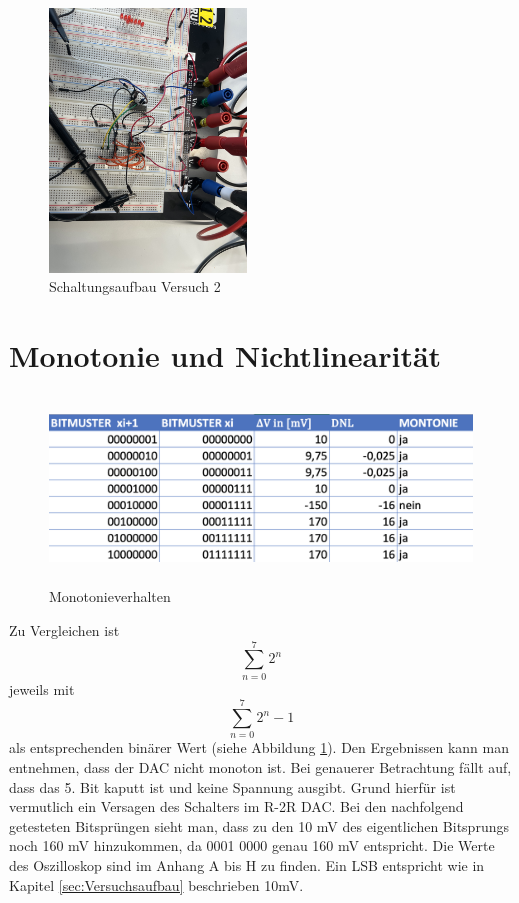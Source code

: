 \begin{figure}[H]
	\centering
	\includegraphics[height=7cm]{images/versuch2-schaltungsaufbau.jpeg} 
	\caption{Schaltungsaufbau Versuch 2}
\end{figure}



\section{Monotonie und Nichtlinearität}

\begin{figure}[H]
	\centering
	\includegraphics[height=5cm]{images/versuch2-monotonie-and-nichtlinearitaet.png} 
	\caption{Monotonieverhalten}
    \label{fig: Monotonieverhalten}
\end{figure}

Zu Vergleichen ist 
\[
\sum_{n=0}^{7} 2^n
\]
jeweils mit 
\[
\sum_{n=0}^{7} 2^n -1
\] als entsprechenden binärer Wert (siehe Abbildung \ref{fig: Monotonieverhalten}).
Den Ergebnissen kann man entnehmen, dass der DAC nicht
monoton ist. Bei genauerer Betrachtung fällt auf, dass das 5.
Bit kaputt ist und keine Spannung ausgibt. Grund hierfür ist 
vermutlich ein Versagen des Schalters im R-2R DAC.
Bei den nachfolgend getesteten Bitsprüngen sieht man, dass zu den
10 mV des eigentlichen Bitsprungs noch 160 mV hinzukommen, da 0001 0000
genau 160 mV entspricht. Die Werte des Oszilloskop sind im Anhang A bis H zu finden.
Ein LSB entspricht wie in Kapitel \ref{sec:Versuchsaufbau} beschrieben 10mV.

